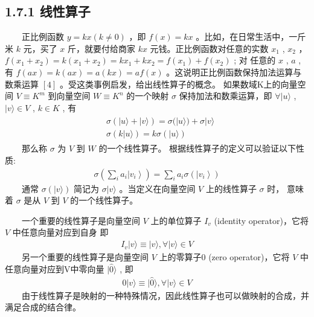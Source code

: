 \documentclass[a4paper,11pt,english]{sphinxmanual}
\begin{document}
\subsection{1.7.1 线性算子}
\label{\detokenize{rst/_u9644_u5f551_u91cf_u5b50_u8ba1_u7b97_u6570_u5b66_u57fa_u78405:id3}}
\sphinxAtStartPar
​  正比例函数  \(y=k x(k \neq 0)\)  ，即  \(f(x)=k x\)  。比如，在日常生活中，一斤米 \(k\) 元，买了 \(x\) 斤，就要付给商家  \({kx}\)  元钱。正比例函数对任意的实数  \(x_{1}\) , \(x_{2}\)  ，  \(f\left(x_{1}+x_{2}\right)=k\left(x_{1}+x_{2}\right)=k x_{1}+k x_{2}=f\left(x_{1}\right)+f\left(x_{2}\right)\) ; 对 任意的  \(x\) , \(a\) ,有  \(f(a x)=k(a x)=a(k x)=a f(x)\)  。这说明正比例函数保持加法运算与数乘运算  \([4]\)  。受这类事例启发，给出线性算子的概念。 如果数域K上的向量空间  \(V \equiv K^{m}\)  到向量空间  \(W \equiv K^{n}\)  的一个映射  \(\sigma\) 保持加法和数乘运算，即  \(\forall|u\rangle\) , \(| {v}\rangle \in V\) , \(k \in K\) , 有
\begin{equation*}
\begin{split}\begin{aligned} &\sigma(|u\rangle+|v\rangle)=\sigma(|u\rangle)+\sigma|v\rangle \\ &\sigma(k|u\rangle)=k \sigma(|u\rangle) \end{aligned}\end{split}
\end{equation*}
\sphinxAtStartPar
​  那么称  \(\sigma\) 为  \(V\) 到 \(W\) 的一个线性算子。 根据线性算子的定义可以验证以下性质:
\begin{equation*}
\begin{split}\sigma\left(\sum_{i} a_{i}\left|v_{i}\right\rangle\right)=\sum_{i} a_{i} \sigma\left(\left|v_{i}\right\rangle\right)\end{split}
\end{equation*}
\sphinxAtStartPar
​  通常  \(\sigma(|v\rangle)\) 简记为 \(\sigma|v\rangle\)  。当定义在向量空间  \(V\)  上的线性算子  \(\sigma\) 时， 意味着 \(\sigma\) 是从 \(V\)  到  \(V\)  的一个线性算子。

\sphinxAtStartPar
​  一个重要的线性算子是向量空间  \(V\)  上的单位算子  \(I_{v}\)  (identity operator)，它将  \(V\)  中任意向量对应到自身 即
\begin{equation*}
\begin{split}I_{v}|v\rangle \equiv|v\rangle, \forall|v\rangle \in V\end{split}
\end{equation*}
\sphinxAtStartPar
​  另一个重要的线性算子是向量空间  \(V\) 上的零算子0 (zero operator)，它将  \(V\)  中任意向量对应到V中零向量  \(|\hat{0}\rangle\)  , 即
\begin{equation*}
\begin{split}0|v\rangle \equiv|\hat{0}\rangle, \forall|v\rangle \in V\end{split}
\end{equation*}
\sphinxAtStartPar
​  由于线性算子是映射的一种特殊情况，因此线性算子也可以做映射的合成，并满足合成的结合律。
\end{document}

